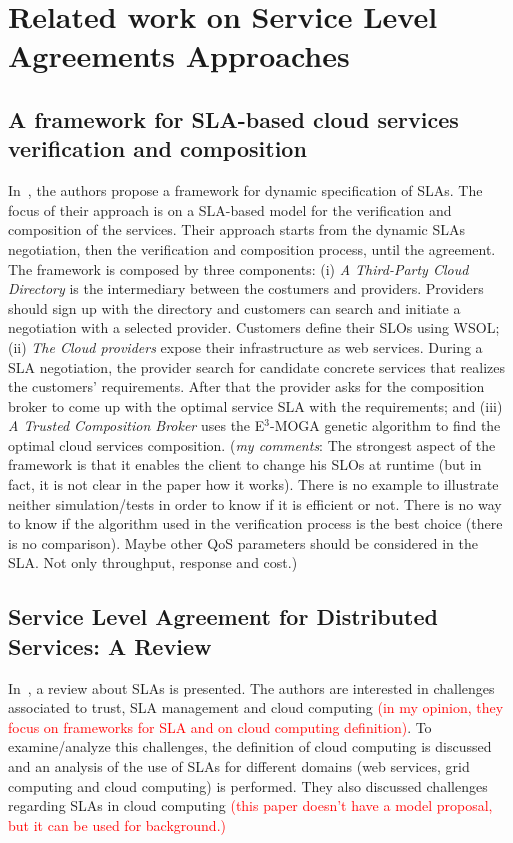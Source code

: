 \documentclass[12pt,a4paper,oneside]{article}
\author{Daniel Aguiar da Silva Carvalho}
\begin{document}
\section{Related work on Service Level Agreements Approaches}

\subsection{A framework for SLA-based cloud services verification and composition}

In~\cite{001}, the authors propose a framework for dynamic specification of SLAs. The focus of their approach is on a SLA-based model for the verification and composition of the services. Their approach starts from the dynamic SLAs negotiation, then the verification and composition process, until the agreement. The framework is composed by three components: (i) \textit{A Third-Party Cloud Directory} is the intermediary between the costumers and providers. Providers should sign up with the directory and customers can search and initiate a negotiation with a selected provider. Customers define their SLOs using WSOL; (ii) \textit{The Cloud providers} expose their infrastructure as web services. During a SLA negotiation, the provider search for candidate concrete services that realizes the customers' requirements. After that the provider asks for the composition broker to come up with the optimal service SLA with the requirements; and (iii) \textit{A Trusted Composition Broker} uses the E$^{3}$-MOGA genetic algorithm to find the optimal cloud services composition. (\textit{my comments}: The strongest aspect of the framework is that it enables the client to change his SLOs at runtime (but in fact, it is not clear in the paper how it works). There is no example to illustrate neither simulation/tests in order to know if it is efficient or not. There is no way to know if the algorithm used in the verification process is the best choice (there is no comparison). Maybe other QoS parameters should be considered in the SLA. Not only throughput, response and cost.)

\subsection{Service Level Agreement for Distributed Services: A Review}

In~\cite{003}, a review about SLAs is presented. The authors are interested in challenges associated to trust, SLA management and cloud computing \textcolor{red}{(in my opinion, they focus on frameworks for SLA and  on cloud computing definition)}. To examine/analyze this challenges, the definition of cloud computing is discussed and an analysis of the use of SLAs for different domains (web services, grid computing and cloud computing) is performed. They also discussed challenges regarding SLAs in cloud computing \textcolor{red}{(this paper doesn't have a model proposal, but it can be used for background.)}
\end{document}
